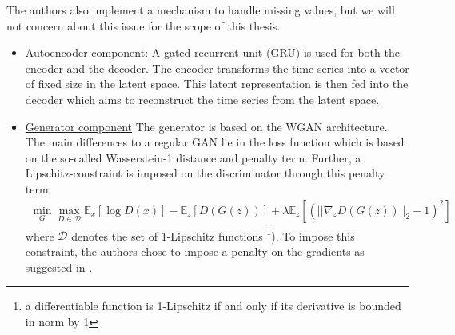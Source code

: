 The authors also implement a mechanism to handle missing values, but we will not concern about this issue for the scope of this thesis.
\begin{itemize}
    \item \underline{Autoencoder component:} A gated recurrent unit (GRU) is used for both the encoder and the decoder. The encoder transforms the time series into a vector of fixed size in the latent space. This latent representation is then fed into the decoder which aims to reconstruct the time series from the latent space.
    \item \underline{Generator component} The generator is based on the WGAN architecture. The main differences to a regular GAN lie in the loss function which is based on the so-called Wasserstein-1 distance and penalty term. Further, a Lipschitz-constraint is imposed on the discriminator through this penalty term.
    \begin{align} \label{eq:wgan_loss}
        \min_G \max_{D \in \mathcal{D}} \mathbb{E}_x[\log D(x)] - \mathbb{E}_z[D(G(z))] + \lambda \mathbb{E}_z [ (||\nabla_z D(G(z))||_2 - 1)^2]
    \end{align}
    where $\mathcal{D}$ denotes the set of 1-Lipschitz functions \footnote[1]{a differentiable function is 1-Lipschitz if and only if its derivative is bounded in norm by 1}). To impose this constraint, the authors chose to impose a penalty on the gradients as suggested in \parencite{arjovsky2017wasserstein}.
\end{itemize}